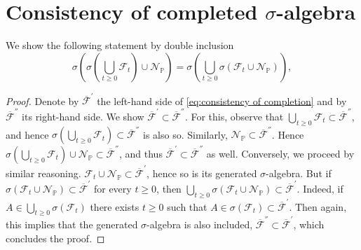 \documentclass[11pt,a4paper,twoside,openany]{report}
\theoremstyle{plain} %
\theoremstyle{definition} %
\theoremstyle{remark} %
\begin{document}
\section{Consistency of completed \(\sigma\)-algebra}\label{Appendix:Consistency of completed sigma-algebra}
We show the following statement by double inclusion
\begin{equation}\label{eq:consistency of completion}
    \sigma(\sigma(\bigcup_{t\geq 0}\mathcal{F}_t)\cup\mathcal{N}_{\mathbb{P}})=\sigma(\bigcup_{t\geq 0}\sigma(\mathcal{F}_t\cup\mathcal{N}_{\mathbb{P}})),
\end{equation}
\begin{proof}
Denote by \(\overline{\mathcal{F}}^{'}\) the left-hand side of \cref{eq:consistency of completion} and by \(\overline{\mathcal{F}}^{''}\) its right-hand side. We show \(\overline{\mathcal{F}}^{'}\subset \overline{\mathcal{F}}^{''}\). For this, observe that \(\bigcup_{t\geq 0}\mathcal{F}_t\subset \overline{\mathcal{F}}^{''}\), and hence \(\sigma(\bigcup_{t\geq 0}\mathcal{F}_t)\subset \overline{\mathcal{F}}^{''}\) is also so. Similarly, \(\mathcal{N}_{\mathbb{P}}\subset\overline{\mathcal{F}}^{''} \). Hence \(\sigma(\bigcup_{t\geq 0}\mathcal{F}_t)\cup \mathcal{N}_{\mathbb{P}}\subset \overline{\mathcal{F}}^{''}\), and thus \(\overline{\mathcal{F}}^{'}\subset \overline{\mathcal{F}}^{''}\) as well. Conversely, we proceed by similar reasoning. \(\mathcal{F}_t\cup\mathcal{N}_{\mathbb{P}}\subset \overline{\mathcal{F}}^{'}\), hence so is its generated \(\sigma\)-algebra. But if \(\sigma(\mathcal{F}_t\cup\mathcal{N}_{\mathbb{P}})\subset\overline{\mathcal{F}}^{'}\) for every \(t\geq 0\), then \(\bigcup_{t\geq 0}\sigma(\mathcal{F}_t\cup\mathcal{N}_{\mathbb{P}})\subset\overline{\mathcal{F}}^{'}\). Indeed, if \(A\in \bigcup_{t\geq 0}\sigma(\mathcal{F}_t)\) there exists \(t\geq 0\) such that \(A\in \sigma(\mathcal{F}_t)\subset\overline{\mathcal{F}}^{'}\). Then again, this implies that the generated \(\sigma\)-algebra is also included, \(\overline{\mathcal{F}}^{''}\subset \overline{\mathcal{F}}^{'}\), which concludes the proof. 
\end{proof}
\end{document}
